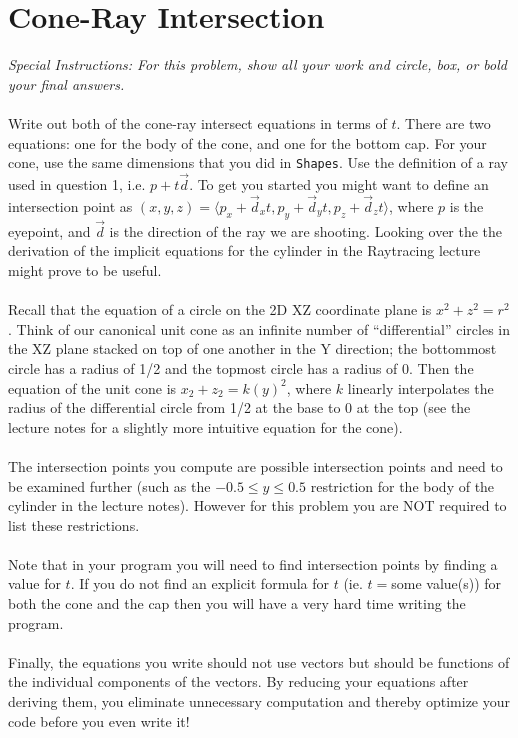 \documentclass[10pt,twocolumn]{article}
\begin{document}
\section{Cone-Ray Intersection}
{\it Special Instructions: For this problem, show all your work and circle, box, or bold your final answers.}\\\\
Write out both of the cone-ray intersect equations in terms of $t$. There are two equations: one for the body of the cone, and one for the bottom cap. For your cone, use the same dimensions that you did in {\tt Shapes}. Use the definition of a ray used in question 1, i.e. $p + t\vec{d}$. To get you started you might want to define
an intersection point as $(x, y, z) = \langle p_x + \vec{d}_xt, p_y + \vec{d}_yt, p_z + \vec{d}_zt\rangle$, where $p$ is the eyepoint, and $\vec{d}$ is the direction of the ray we are shooting. Looking over the the derivation of the implicit equations for the cylinder in the Raytracing lecture might prove to be useful.\\\\
Recall that the equation of a circle on the 2D XZ coordinate plane is $x^2 + z^2 = r^2$. Think of our canonical unit cone as an infinite number of ``differential'' circles in the XZ plane stacked on top of one another in the Y direction; the bottommost circle has a radius of 1/2 and the topmost circle has a radius of 0. Then the equation of the unit cone is $x_2 + z_2 = k(y)^2$, where $k$ linearly interpolates the radius of the differential circle from 1/2 at the base to 0 at the top (see the lecture notes for a slightly more intuitive equation for the cone).\\\\
The intersection points you compute are possible intersection points and need to be
examined further (such as the $-0.5\le y\le 0.5$ restriction for the body of the cylinder
in the lecture notes). However for this problem you are NOT required to list these
restrictions.\\\\
Note that in your program you will need to find intersection points by finding a value for $t$. If you do not find an explicit formula for $t$ (ie. $t = $some value(s)) for both the cone and the cap then you will have a very hard time writing the program.\\\\
Finally, the equations you write should not use vectors but should be functions of the individual components of the vectors. By reducing your equations after deriving them, you eliminate unnecessary computation and thereby optimize your code before you even write it!
\end{document}
